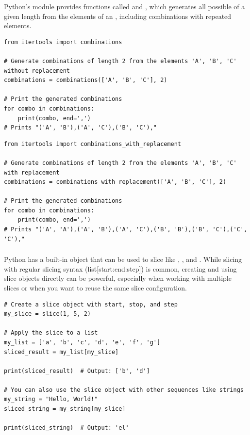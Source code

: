 Python's  module provides functions called  and , which generates all possible  of a given length from the elements of an , including combinations with repeated elements.
\begin{lstlisting}
from itertools import combinations

# Generate combinations of length 2 from the elements 'A', 'B', 'C' without replacement
combinations = combinations(['A', 'B', 'C'], 2)

# Print the generated combinations
for combo in combinations:
    print(combo, end=',')
# Prints "('A', 'B'),('A', 'C'),('B', 'C'),"
\end{lstlisting}
\begin{lstlisting}
from itertools import combinations_with_replacement

# Generate combinations of length 2 from the elements 'A', 'B', 'C' with replacement
combinations = combinations_with_replacement(['A', 'B', 'C'], 2)

# Print the generated combinations
for combo in combinations:
    print(combo, end=',')
# Prints "('A', 'A'),('A', 'B'),('A', 'C'),('B', 'B'),('B', 'C'),('C', 'C'),"
\end{lstlisting}











\subsubsection{}

Python has a built-in  object that can be used to slice  like , , and . While slicing with regular slicing syntax (list[start:end:step]) is common, creating and using slice objects directly can be powerful, especially when working with multiple slices or when you want to reuse the same slice configuration.
\begin{lstlisting}
# Create a slice object with start, stop, and step
my_slice = slice(1, 5, 2)

# Apply the slice to a list
my_list = ['a', 'b', 'c', 'd', 'e', 'f', 'g']
sliced_result = my_list[my_slice]

print(sliced_result)  # Output: ['b', 'd']

# You can also use the slice object with other sequences like strings
my_string = "Hello, World!"
sliced_string = my_string[my_slice]

print(sliced_string)  # Output: 'el'
\end{lstlisting}


